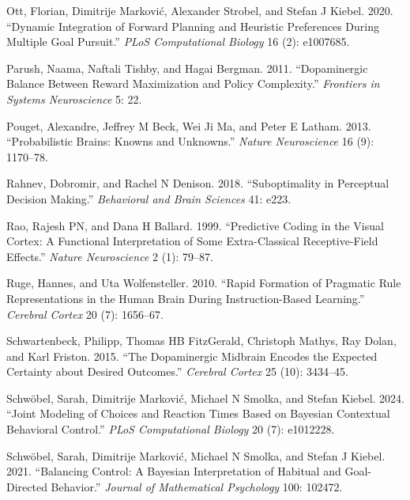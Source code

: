 \documentclass[
  letterpaper,
  DIV=11,
  numbers=noendperiod]{scrartcl}
\newlength{\cslhangindent}
\newenvironment{CSLReferences}[2] %
 {\begin{list}{}{%
  \setlength{\itemindent}{0pt}
  \setlength{\leftmargin}{0pt}
  \setlength{\parsep}{0pt}
  \ifodd #1
   \setlength{\leftmargin}{\cslhangindent}
   \setlength{\itemindent}{-1\cslhangindent}
  \fi
  \setlength{\itemsep}{#2\baselineskip}}}
 {\end{list}}
\begin{document}
\begin{CSLReferences}{1}{1}
Ott, Florian, Dimitrije Marković, Alexander Strobel, and Stefan J
Kiebel. 2020. {``Dynamic Integration of Forward Planning and Heuristic
Preferences During Multiple Goal Pursuit.''} \emph{PLoS Computational
Biology} 16 (2): e1007685.

Parush, Naama, Naftali Tishby, and Hagai Bergman. 2011. {``Dopaminergic
Balance Between Reward Maximization and Policy Complexity.''}
\emph{Frontiers in Systems Neuroscience} 5: 22.

Pouget, Alexandre, Jeffrey M Beck, Wei Ji Ma, and Peter E Latham. 2013.
{``Probabilistic Brains: Knowns and Unknowns.''} \emph{Nature
Neuroscience} 16 (9): 1170--78.

Rahnev, Dobromir, and Rachel N Denison. 2018. {``Suboptimality in
Perceptual Decision Making.''} \emph{Behavioral and Brain Sciences} 41:
e223.

Rao, Rajesh PN, and Dana H Ballard. 1999. {``Predictive Coding in the
Visual Cortex: A Functional Interpretation of Some Extra-Classical
Receptive-Field Effects.''} \emph{Nature Neuroscience} 2 (1): 79--87.

Ruge, Hannes, and Uta Wolfensteller. 2010. {``Rapid Formation of
Pragmatic Rule Representations in the Human Brain During
Instruction-Based Learning.''} \emph{Cerebral Cortex} 20 (7): 1656--67.

Schwartenbeck, Philipp, Thomas HB FitzGerald, Christoph Mathys, Ray
Dolan, and Karl Friston. 2015. {``The Dopaminergic Midbrain Encodes the
Expected Certainty about Desired Outcomes.''} \emph{Cerebral Cortex} 25
(10): 3434--45.

Schwöbel, Sarah, Dimitrije Marković, Michael N Smolka, and Stefan
Kiebel. 2024. {``Joint Modeling of Choices and Reaction Times Based on
Bayesian Contextual Behavioral Control.''} \emph{PLoS Computational
Biology} 20 (7): e1012228.

Schwöbel, Sarah, Dimitrije Marković, Michael N Smolka, and Stefan J
Kiebel. 2021. {``Balancing Control: A Bayesian Interpretation of
Habitual and Goal-Directed Behavior.''} \emph{Journal of Mathematical
Psychology} 100: 102472.


\end{CSLReferences}
\end{document}
